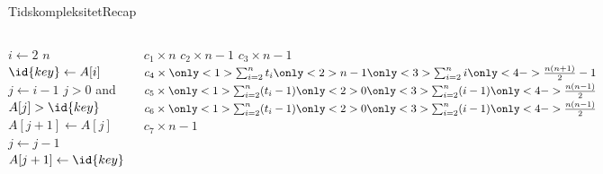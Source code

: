 \documentclass{beamer}
\begin{document}
\begin{frame}{Tidskompleksitet}{Recap}
    \begin{description}
    \end{description}

    \begin{columns}
        \begin{codebox}
            \li \For $i \gets 2$ \To $n$ \Do
                \li $\id{key} \gets A[i]$
                \li $j \gets i - 1$
                \li \While $j > 0$ and $A[j] > \id{key}$ \Do
                    \li $A[j+1] \gets A[j]$
                    \li $j \gets j - 1$
                \End
                \li $A[j+1] \gets \id{key}$
            \End
        \end{codebox}
        
        \begin{codebox}
            \zi $c_1 \times n$
            \zi $c_2 \times n - 1$
            \zi $c_3 \times n - 1$
            \zi $c_4 \times \only<1>{\sum^{n}_{i=2}t_i}
                    \only<2>{n-1}
                    \only<3>{\sum^{n}_{i=2}i}
                    \only<4->{\frac{n(n+1)}{2}-1}$
            \zi $c_5 \times \only<1>{\sum^{n}_{i=2}(t_i-1)}
                    \only<2>{0}
                    \only<3>{\sum^{n}_{i=2}(i-1)}
                    \only<4->{\frac{n(n-1)}{2}}$
            \zi $c_6 \times \only<1>{\sum^{n}_{i=2}(t_i-1)}
                    \only<2>{0}
                    \only<3>{\sum^{n}_{i=2}(i-1)}
                    \only<4->{\frac{n(n-1)}{2}}$
            \zi $c_7 \times n - 1$
        \end{codebox}
    \end{columns}

\end{frame}
\end{document}
